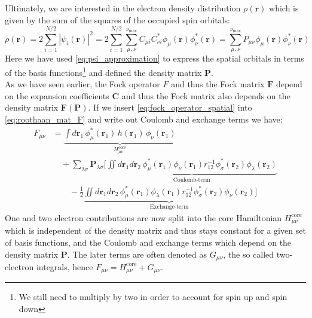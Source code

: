 Ultimately, we are interested in the electron density distribution $\rho(\mathbf{r})$ which is given by the sum of the squares of the occupied spin orbitals: 
\begin{equation}
    \rho(\mathbf{r}) = 2 \sum_{i=1}^{N/2} |\psi_i(\mathbf{r})|^2 = 2 \sum_{i=1}^{N/2} \sum_{\mu,\nu}^{\nu_\text{max}} C_{\mu i} C_{\nu i}^* \phi_\mu(\mathbf{r}) \phi_\nu^*(\mathbf{r}) = \sum_{\mu,\nu}^{\nu_\text{max}} P_{\mu \nu} \phi_\mu(\mathbf{r}) \phi_\nu^*(\mathbf{r})
\end{equation}
Here we have used \autoref{eq:psi_approximation} to express the spatial orbitals in terms of the basis functions\footnote{We still need to multiply by two in order to account for spin up and spin down} and defined the density matrix $\mathbf{P}$.\\
As we have seen earlier, the Fock operator $F$ and thus the Fock matrix $\mathbf{F}$ depend on the expansion coefficients $\mathbf{C}$ and thus the Fock matrix also depends on the density matrix $\mathbf{F(P)}$. If we insert \autoref{eq:fock_operator_spatial} into \autoref{eq:roothaan_mat_F} and write out Coulomb and exchange terms we have: 
\begin{align}
    \label{eq:fock_full_eq_coul_ex}
        F_{\mu \nu} &= \underbrace{\int d\mathbf{r}_1\, \phi_\mu^*(\mathbf{r}_1)\, h(\mathbf{r}_1)\, \phi_\nu(\mathbf{r}_1) \nonumber}_{H_{\mu\nu}^\text{core}} \\
        &\quad + \sum_{\lambda \sigma} \mathbf{P}_{\lambda \sigma} \Bigg[
            \underbrace{\iint  d\mathbf{r}_1 d\mathbf{r}_2\, \phi_\mu^*(\mathbf{r}_1) \phi_\nu(\mathbf{r}_1) r_{12}^{-1} \phi_\sigma^*(\mathbf{r}_2) \phi_\lambda(\mathbf{r}_2) \nonumber}_{\text{Coulomb-term}} \\
            &\qquad - \frac{1}{2} \underbrace{\iint d\mathbf{r}_1 d\mathbf{r}_2\, \phi_\mu^*(\mathbf{r}_1) \phi_\lambda(\mathbf{r}_1) r_{12}^{-1} \phi_\sigma^*(\mathbf{r}_2) \phi_\nu(\mathbf{r}_2)}_{\text{Exchange-term}}
            \Bigg]
\end{align}
One and two electron contributions are now split into the core Hamiltonian $H_{\mu\nu}^\text{core}$ which is independent of the density matrix and thus stays constant for a given set of basis functions, and the Coulomb and exchange terms which depend on the density matrix $\mathbf{P}$. The later terms are often denoted as $G_{\mu\nu}$, the so called two-electron integrals, hence $F_{\mu \nu} = H_{\mu\nu}^\text{core} + G_{\mu\nu}$.\\

